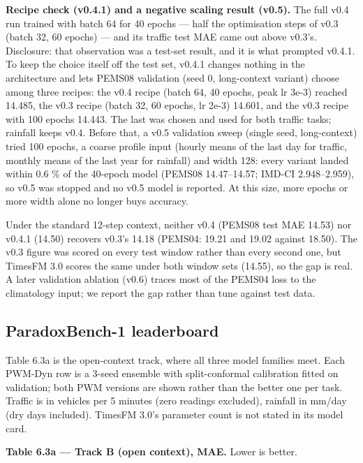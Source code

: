 \documentclass[
  10pt,
]{article}
\begin{document}
\textbf{Recipe check (v0.4.1) and a negative scaling result (v0.5).} The
full v0.4 run trained with batch 64 for 40 epochs --- half the
optimisation steps of v0.3 (batch 32, 60 epochs) --- and its traffic
test MAE came out above v0.3's. Disclosure: that observation was a
test-set result, and it is what prompted v0.4.1. To keep the choice
itself off the test set, v0.4.1 changes nothing in the architecture and
lets PEMS08 validation (seed 0, long-context variant) choose among three
recipes: the v0.4 recipe (batch 64, 40 epochs, peak lr 3e-3) reached
14.485, the v0.3 recipe (batch 32, 60 epochs, lr 2e-3) 14.601, and the
v0.3 recipe with 100 epochs 14.443. The last was chosen and used for
both traffic tasks; rainfall keeps v0.4. Before that, a v0.5 validation
sweep (single seed, long-context) tried 100 epochs, a coarse profile
input (hourly means of the last day for traffic, monthly means of the
last year for rainfall) and width 128: every variant landed within 0.6
\% of the 40-epoch model (PEMS08 14.47--14.57; IMD-CI 2.948--2.959), so
v0.5 was stopped and no v0.5 model is reported. At this size, more
epochs or more width alone no longer buys accuracy.

Under the standard 12-step context, neither v0.4 (PEMS08 test MAE 14.53)
nor v0.4.1 (14.50) recovers v0.3's 14.18 (PEMS04: 19.21 and 19.02
against 18.50). The v0.3 figure was scored on every test window rather
than every second one, but TimesFM 3.0 scores the same under both window
sets (14.55), so the gap is real. A later validation ablation (v0.6) traces most of
the PEMS04 loss to the climatology input; we report the gap rather than
tune against test data.

\subsection{ParadoxBench-1 leaderboard}

Table 6.3a is the open-context track, where all three model families
meet. Each PWM-Dyn row is a 3-seed ensemble with split-conformal
calibration fitted on validation; both PWM versions are shown rather
than the better one per task. Traffic is in vehicles per 5 minutes (zero
readings excluded), rainfall in mm/day (dry days included). TimesFM
3.0's parameter count is not stated in its model card.

\textbf{Table 6.3a --- Track B (open context), MAE.} Lower is better.
\end{document}
